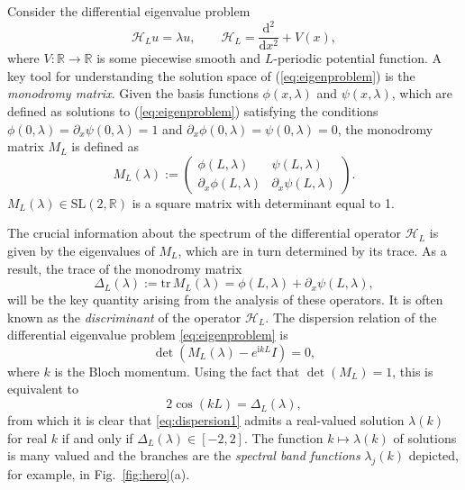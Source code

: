 \documentclass[nofootinbib,prb,amsmath,amssymb,twocolumn,floatfix]{revtex4-2}
\theoremstyle{definition}
\newcommand{\dd}[2]{\frac{\mathrm{d}#1}{\mathrm{d}#2}}
\newcommand{\Hill}{\mathcal{H}}
\renewcommand{\i}{\mathrm{i}}
\begin{document}
Consider the differential eigenvalue problem 
\begin{equation} \label{eq:eigenproblem}
	\Hill_L u=\lambda u, \qquad
		\Hill_L=\dd{^2}{x^2}+V(x),
\end{equation}
where  $V:\mathbb{R}\to\mathbb{R}$ is some  piecewise smooth and $L$-periodic potential function. A key tool for understanding the solution space of (\ref{eq:eigenproblem}) is the \emph{monodromy matrix}. Given the basis functions $\phi(x,\lambda)$ and $\psi(x,\lambda)$, which are defined as solutions to (\ref{eq:eigenproblem}) satisfying the conditions $\phi(0,\lambda)=\partial_x \psi(0,\lambda)=1$ and $\partial_x \phi(0,\lambda)= \psi(0,\lambda)=0$, the monodromy matrix $M_L$ is defined as
\begin{equation} \label{eq:monod_mat}
	M_L(\lambda):=\begin{pmatrix} \phi(L,\lambda) & \psi(L,\lambda) \\ \partial_x\phi(L,\lambda) & \partial_x\psi(L,\lambda) \end{pmatrix}.
\end{equation}
$M_L(\lambda)\in\mathrm{SL}(2,\mathbb{R})$ is a square matrix with determinant equal to 1.

The crucial information about the spectrum of the differential operator $\Hill_L$ is given by the eigenvalues of $M_L$, which are in turn determined by its trace. As a result, the trace of the monodromy matrix
\begin{equation} \label{eq:discriminant}
	\Delta_L(\lambda) := \mathrm{tr} \, M_L(\lambda) = \phi(L,\lambda)+\partial_x\psi(L,\lambda),
\end{equation}
will be the key quantity arising from the analysis of these operators. It is often known as the \emph{discriminant} of the operator $\Hill_L$. %
The dispersion relation of the differential eigenvalue problem \eqref{eq:eigenproblem} is 
\begin{equation} \label{eq:dispersion1}
	\det\left( M_L(\lambda) - e^{\i k L}I \right)=0,
\end{equation}
where $k$ is the Bloch momentum.  Using the fact that $\det(M_L)=1$, this is equivalent to
\begin{equation} \label{eq:dispersion}
	2\cos(k L) = \Delta_L(\lambda),
\end{equation}
from which it is clear that \eqref{eq:dispersion1} admits a real-valued solution $\lambda(k)$ for real $k$ if and only if $\Delta_L(\lambda)\in[-2,2]$. The function $k\mapsto \lambda(k)$ of solutions is many valued and the branches are the \textit{spectral band functions} $\lambda_j(k)$ depicted, for example, in Fig.~\ref{fig:hero}(a).
\end{document}
